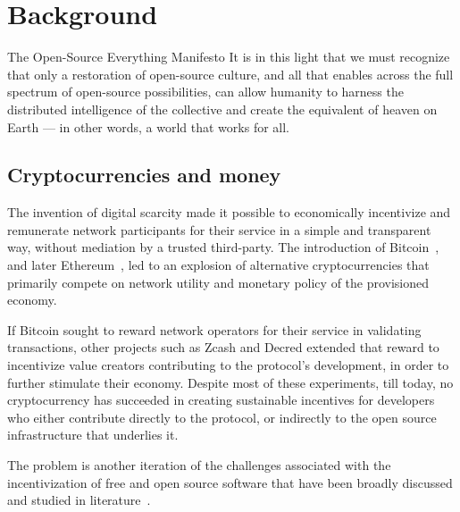 \section{Background}

\begin{epigraph}{The Open-Source Everything Manifesto}
    \noindent It is in this light that we must recognize that only a restoration of
    open-source culture, and all that enables across the full spectrum of
    open-source possibilities, can allow humanity to harness the distributed
    intelligence of the collective and create the equivalent of heaven on Earth
    --- in other words, a world that works for all.
\end{epigraph}

\subsection{Cryptocurrencies and money}

The invention of digital scarcity made it possible to economically incentivize
and remunerate network participants for their service in a simple and
transparent way, without mediation by a trusted third-party. The introduction
of Bitcoin~\cite{bitcoin}, and later Ethereum~\cite{ethereum}, led to an
explosion of alternative cryptocurrencies that primarily compete on network
utility and monetary policy of the provisioned economy.


If Bitcoin sought to reward network operators for their service in validating
transactions, other projects such as Zcash and Decred extended that reward to
incentivize value creators contributing to the protocol's development, in order to
further stimulate their economy. Despite most of these experiments, till today,
no cryptocurrency has succeeded in creating sustainable incentives for
developers who either contribute directly to the protocol, or indirectly to the
open source infrastructure that underlies it.

The problem is another iteration of the challenges associated with the
incentivization of free and open source software that have been broadly
discussed and studied in literature~\cite{roads and bridges}.

